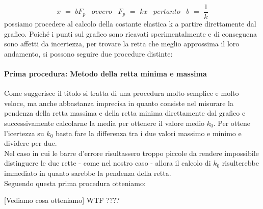 \begin{equation}
	x \,\,=\,\, bF_p \,\,\,\,\,ovvero\,\,\,\,\, F_p \,\,=\,\, kx \,\,\,\,\,pertanto\,\,\,\,\, b \,\,=\,\, \frac{1}{k}
\end{equation}
%
possiamo procedere al calcolo della costante elastica k a partire direttamente dal grafico. Poiché i punti sul grafico sono ricavati sperimentalmente e di conseguena sono affetti da incertezza, per trovare la retta che meglio approssima il loro andamento, si possono seguire due procedure distinte:

\paragraph{Prima procedura: Metodo della retta minima e massima\\}
Come suggerisce il titolo si tratta di una procedura molto semplice e molto veloce, ma anche abbastanza imprecisa in quanto consiste nel misurare la pendenza della retta massima e della retta minima direttamente dal grafico e successivamente calcolarne la media per ottenere il valore medio $k_0$. Per ottene l'icertezza su $k_0$ basta fare la differenza tra i due valori massimo e minimo e dividere per due.\\
Nel caso in cui le barre d'errore risultassero troppo piccole da rendere impossibile distinguere le due rette - come nel nostro caso - allora il calcolo di $k_0$ risulterebbe immediato in quanto sarebbe la pendenza della retta.\\
Seguendo questa prima procedura otteniamo:

[Vediamo cosa otteniamo] WTF ????

